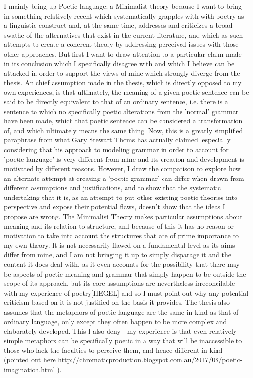 \documentclass[]{article}
\begin{document}
I mainly bring up Poetic language: a Minimalist theory because I want to bring in something relatively recent which systematically grapples with with poetry as a linguistic construct and, at the same time, addresses and criticizes a broad swathe of the alternatives that exist in the current literature, and which as such attempts to create a coherent theory by addressing perceived issues with those other approaches. But first I want to draw attention to a particular claim made in its conclusion which I specifically disagree with and which I believe can be attacked in order to support the views of mine which strongly diverge from the thesis. An chief assumption made in the thesis, which is directly opposed to my own experiences, is that ultimately, the meaning of a given poetic sentence can be said to be directly equivalent to that of an ordinary sentence, i.e. there is a sentence to which no specifically poetic alterations from the 'normal' grammar have been made, which that poetic sentence can be considered a transformation of, and which ultimately means the same thing. Now, this is a greatly simplified paraphrase from what Gary Stewart Thoms has actually claimed, especially considering that his approach to modeling grammar in order to account for 'poetic language' is very different from mine and its creation and development is motivated by different reasons. However, I draw the comparison to explore how an alternate attempt at creating a 'poetic grammar' can differ when drawn from different assumptions and justifications, and to show that the systematic undertaking that it is, as an attempt to put other existing poetic theories into perspective and expose their potential flaws, doesn't show that the ideas I propose are wrong. The Minimalist Theory makes particular assumptions about meaning and its relation to structure, and because of this it has no reason or motivation to take into account the structures that are of prime importance to my own theory. It is not necessarily flawed on a fundamental level as its aims differ from mine, and I am not bringing it up to simply disparage it and the content it does deal with, as it even accounts for the possibility that there may be aspects of poetic meaning and grammar that simply happen to be outside the scope of its approach, but its core assumptions are nevertheless irreconcilable with my experience of poetry[HEGEL] and so I must point out why any potential criticism based on it is not justified on the basis it provides. The thesis also assumes that the metaphors of poetic language are the same in kind as that of ordinary language, only except they often happen to be more complex and elaborately developed. This I also deny—my experience is that even relatively simple metaphors can be specifically poetic in a way that will be inaccessible to those who lack the faculties to perceive them, and hence different in kind (pointed out here http://chromaticproduction.blogspot.com.au/2017/08/poetic-imagination.html ).
\end{document}
